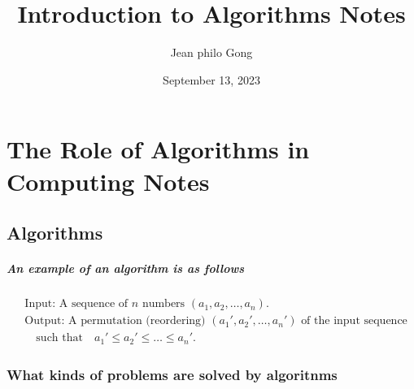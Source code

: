 \documentclass{tufte-book}
\title{Introduction to Algorithms Notes}
\author{Jean philo Gong}
\date{September 13, 2023}
\begin{document}
\maketitle
\chapter{The Role of Algorithms in Computing Notes}

\section{Algorithms}

\paragraph{An example of an algorithm is as follows}
\begin{align*}
    &\text{Input: A sequence of } n \text{ numbers } (a_1, a_2, \ldots, a_n). \\
    &\text{Output: A permutation (reordering) } (a_1', a_2', \ldots, a_n') \text{ of the input sequence} \\
    &\quad \text{such that}\quad  a_1' \leq a_2' \leq \ldots \leq a_n'.
\end{align*}

\subsection*{What kinds of problems are solved by algoritnms}

\end{document}

